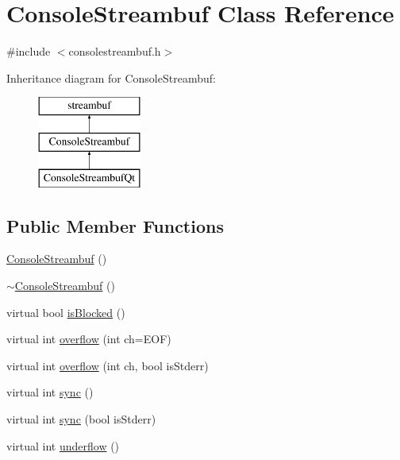 \hypertarget{classstanfordcpplib_1_1ConsoleStreambuf}{}\section{Console\+Streambuf Class Reference}
\label{classstanfordcpplib_1_1ConsoleStreambuf}


{\ttfamily \#include $<$consolestreambuf.\+h$>$}

Inheritance diagram for Console\+Streambuf\+:\begin{figure}[H]
\begin{center}
\leavevmode
\includegraphics[height=3.000000cm]{classstanfordcpplib_1_1ConsoleStreambuf}
\end{center}
\end{figure}
\subsection*{Public Member Functions}
\begin{DoxyCompactItemize}
\item 
\mbox{\hyperlink{classstanfordcpplib_1_1ConsoleStreambuf_a00319cc8035be74bbc3bb63d60b8c8da}{Console\+Streambuf}} ()
\item 
\mbox{\hyperlink{classstanfordcpplib_1_1ConsoleStreambuf_ae72ddab09d66eb582db69ea4132288ab}{$\sim$\+Console\+Streambuf}} ()
\item 
virtual bool \mbox{\hyperlink{classstanfordcpplib_1_1ConsoleStreambuf_a61d5d93ba4956eefeb2e3d617d34c801}{is\+Blocked}} ()
\item 
virtual int \mbox{\hyperlink{classstanfordcpplib_1_1ConsoleStreambuf_adccb3cd5475ba3c83bc2b0a8cbd731c0}{overflow}} (int ch=E\+OF)
\item 
virtual int \mbox{\hyperlink{classstanfordcpplib_1_1ConsoleStreambuf_a5cfed6bdc955e2129ced962625045f8e}{overflow}} (int ch, bool is\+Stderr)
\item 
virtual int \mbox{\hyperlink{classstanfordcpplib_1_1ConsoleStreambuf_a810a727ce5554d3178e17b6bc55025dd}{sync}} ()
\item 
virtual int \mbox{\hyperlink{classstanfordcpplib_1_1ConsoleStreambuf_ad5f4344df2a20a0000adb05d4e656855}{sync}} (bool is\+Stderr)
\item 
virtual int \mbox{\hyperlink{classstanfordcpplib_1_1ConsoleStreambuf_aeb6918bd44153b257e097e2d2ef370ef}{underflow}} ()
\end{DoxyCompactItemize}
